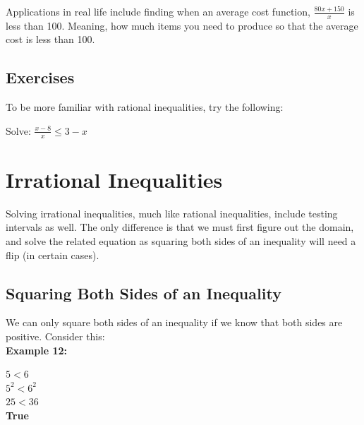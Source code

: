 \documentclass[12pt,fleqn]{book} %
\begin{document}
Applications in real life include finding when an average cost function, $\frac{80x+150}{x}$ is less than 100. Meaning, how much items you need to produce so that the average cost is less than 100. 


\section{Exercises}

To be more familiar with rational inequalities, try the following:

\begin{exercise}
Solve: $\frac{x-8}{x}\leq3-x$
\end{exercise}



\chapter{Irrational Inequalities}

\noindent Solving irrational inequalities, much like rational inequalities, include testing intervals as well. The only difference is that we must first figure out the domain, and solve the related equation as squaring both sides of an inequality will need a flip (in certain cases). 

\section{Squaring Both Sides of an Inequality}

\noindent We can only square both sides of an inequality if we know that both sides are positive. Consider this:\\
\textbf{Example 12:}

\vspace*{-5mm}

\begin{center}
    $5<6$\\
    $5^2<6^2$\\
    $25<36$\\
    \textbf{True}\\
\end{center}
\end{document}
